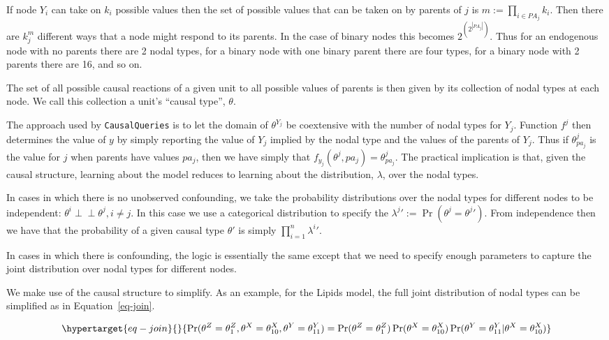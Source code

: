 \documentclass[
  11pt,
  article]{jss}
\begin{document}
If node \(Y_i\) can take on \(k_i\) possible values then the set of
possible values that can be taken on by parents of \(j\) is
\(m :=\prod_{i\in PA_j}k_i\). Then there are \(k_j^{m}\) different ways
that a node might respond to its parents. In the case of binary nodes
this becomes \(2^{\left(2^{|PA_j|}\right)}\). Thus for an endogenous
node with no parents there are 2 nodal types, for a binary node with one
binary parent there are four types, for a binary node with 2 parents
there are 16, and so on.

The set of all possible causal reactions of a given unit to all possible
values of parents is then given by its collection of nodal types at each
node. We call this collection a unit's ``causal type'', \(\theta\).

The approach used by \texttt{CausalQueries} is to let the domain of
\(\theta^{Y_j}\) be coextensive with the number of nodal types for
\(Y_j\). Function \(f^j\) then determines the value of \(y\) by simply
reporting the value of \(Y_j\) implied by the nodal type and the values
of the parents of \(Y_j\). Thus if \(\theta^j_{pa_j}\) is the value for
\(j\) when parents have values \(pa_j\), then we have simply that
\(f_{y_j}(\theta^{j}, pa_j) = \theta^j_{pa_j}\). The practical
implication is that, given the causal structure, learning about the
model reduces to learning about the distribution, \(\lambda\), over the
nodal types.

In cases in which there is no unobserved confounding, we take the
probability distributions over the nodal types for different nodes to be
independent: \(\theta^i \perp\!\!\! \perp \theta^j, i\neq j\). In this
case we use a categorical distribution to specify the
\({\lambda^j}' := \Pr(\theta^j = {\theta^j}')\). From independence then
we have that the probability of a given causal type \(\theta'\) is
simply \(\prod_{i=1}^n {\lambda^i}'\).

In cases in which there is confounding, the logic is essentially the
same except that we need to specify enough parameters to capture the
joint distribution over nodal types for different nodes.

We make use of the causal structure to simplify. As an example, for the
Lipids model, the full joint distribution of nodal types can be
simplified as in Equation~\ref{eq-join}.

\begin{equation}\protect\hypertarget{eq-join}{}{
\Pr(\theta^Z = \theta^Z_1, \theta^X = \theta^X_{10}, \theta^Y = \theta^Y_{11}) = 
\Pr(\theta^Z = \theta^Z_1)\Pr(\theta^X = \theta^X_{10})\Pr(\theta^Y = \theta^Y_{11}|\theta^X = \theta^X_{10})
}\label{eq-join}\end{equation}
\end{document}
